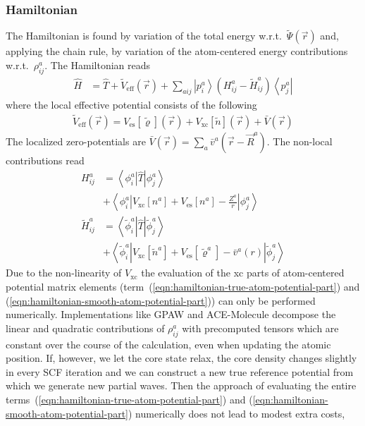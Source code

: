 \documentclass[oribibl]{llncs}
\newcommand{\um}[1]{_{\mathrm{#1}}}
\newcommand{\ket}[1]{\left| #1 \right\rangle}
\newcommand{\bra}[1]{\left\langle #1 \right|}
\newcommand{\braketop}[3]{\left\langle \left. #1 \right| #2 \left| #3 \right. \right\rangle}
\begin{document}
\subsubsection{Hamiltonian}
%
The Hamiltonian is found by variation of the total energy w.r.t.~$\tilde \Psi(\vec r)$
and, applying the chain rule, 
by variation of the atom-centered energy contributions w.r.t.~$\rho^a_{ij}$.
%
The Hamiltonian reads
\begin{align}
  \hat H &= \hat T + \tilde V\um{eff}(\vec r) + \sum_{aij} \ket{p^a_i} \left( H^a_{ij} - \tilde H^a_{ij} \right)
  \bra{p^a_j}
\end{align}
where the local effective potential consists of the following
\begin{align}
  \tilde V\um{eff}(\vec r) = V\um{es}[\tilde\varrho](\vec r) + V\um{xc}[\tilde n](\vec r) + \bar V(\vec r)
\end{align}
The localized zero-potentials are $\bar V(\vec r) = \sum_a \bar v^a(\vec r - \vec R^a)$.
The non-local contributions read
\begin{align}
	H^a_{ij} &= \braketop{ \phi^a_i }{ \hat T }{ \phi^a_j } \\
	         &+ \braketop{ \phi^a_i }{ V\um{xc}[n^a] + V\um{es}[n^a] - \frac{Z^a}{r} }{ \phi^a_j } 
	         \label{eqn:hamiltonian-true-atom-potential-part} \\
	\tilde H^a_{ij} &= \braketop{ \tilde\phi^a_i }{ \hat T }{ \tilde\phi^a_j } \\
	         &+ \braketop{ \tilde\phi^a_i }{ V\um{xc}[\tilde n^a] + V\um{es}[\tilde\varrho^a] - \bar v^a(r) }{ \tilde\phi^a_j }
	         \label{eqn:hamiltonian-smooth-atom-potential-part}
\end{align}
Due to the non-linearity of $V\um{xc}$ the evaluation of the \ac{xc} parts of atom-centered potential matrix elements
(term~(\ref{eqn:hamiltonian-true-atom-potential-part}) and (\ref{eqn:hamiltonian-smooth-atom-potential-part}))
can only be performed numerically.
Implementations like GPAW \cite{GPAW,Rostgaard-paw-note} and ACE-Molecule \cite{Kang2016}
decompose the linear and quadratic contributions of $\rho^a_{ij}$ with precomputed tensors
which are constant over the course of the calculation, even when updating the atomic position.
If, however, we let the core state relax, the core density changes slightly in every SCF iteration
and we can construct a new true reference potential from which we generate new partial waves.
Then the approach of evaluating the entire terms~(\ref{eqn:hamiltonian-true-atom-potential-part}) and (\ref{eqn:hamiltonian-smooth-atom-potential-part}) numerically does not lead to modest extra costs, 
\end{document}
